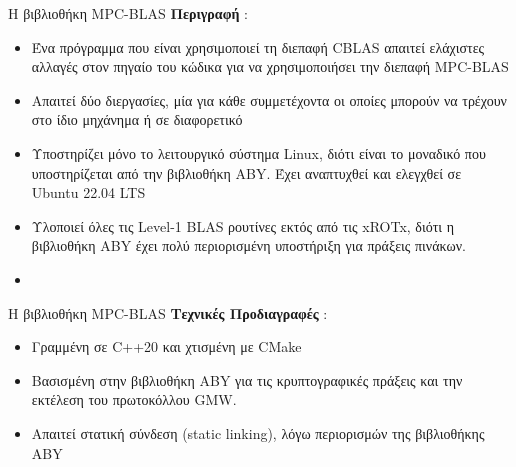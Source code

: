 \documentclass[10pt]{beamer}
\begin{document}
    \begin{frame}{Η βιβλιοθήκη MPC-BLAS}
        \textbf{Περιγραφή} :
        \begin{itemize}
            \item Ένα πρόγραμμα που είναι χρησιμοποιεί τη διεπαφή CBLAS απαιτεί ελάχιστες αλλαγές στον πηγαίο του κώδικα για να χρησιμοποιήσει την διεπαφή MPC-BLAS
            \item Απαιτεί δύο διεργασίες, μία για κάθε συμμετέχοντα οι οποίες μπορούν να τρέχουν στο ίδιο μηχάνημα ή σε διαφορετικό
            \item Υποστηρίζει μόνο το λειτουργικό σύστημα Linux, διότι είναι το μοναδικό που υποστηρίζεται από την βιβλιοθήκη ABY. Έχει αναπτυχθεί και ελεγχθεί σε Ubuntu 22.04 LTS
            \item Υλοποιεί όλες τις Level-1 BLAS ρουτίνες εκτός από τις xROTx, διότι η βιβλιοθήκη ABY έχει πολύ περιορισμένη υποστήριξη για πράξεις πινάκων.
            \item
        \end{itemize}
    \end{frame}

    \begin{frame}{Η βιβλιοθήκη MPC-BLAS}
        \textbf{Τεχνικές Προδιαγραφές} :
        \begin{itemize}
            \item Γραμμένη σε C++20 και χτισμένη με CMake
            \item Βασισμένη στην βιβλιοθήκη ABY για τις κρυπτογραφικές πράξεις και την εκτέλεση του πρωτοκόλλου GMW.
            \item Απαιτεί στατική σύνδεση (static linking), λόγω περιορισμών της βιβλιοθήκης ABY
        \end{itemize}
    \end{frame}
\end{document}

